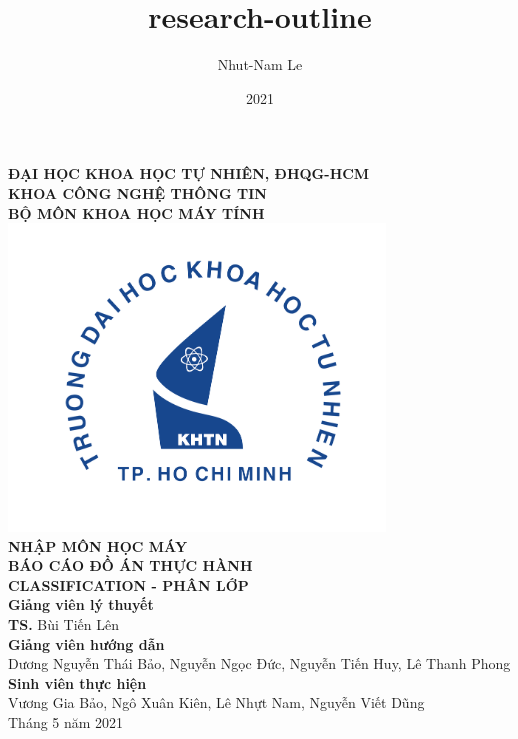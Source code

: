 \documentclass{article}
\title{research-outline}
\author{Nhut-Nam Le}
\date{2021}
\newcommand\B{\rule[-1.2ex]{0pt}{0pt}} %
\begin{document}
	\begin{titlepage}
		\begin{center}
			\large{\textbf{ĐẠI HỌC KHOA HỌC TỰ NHIÊN, ĐHQG-HCM\\KHOA CÔNG NGHỆ THÔNG TIN\\BỘ MÔN KHOA HỌC MÁY TÍNH}}\\
			\includegraphics[width=0.75\textwidth]{images/khtn.png}\\
			\large \textbf{NHẬP MÔN HỌC MÁY}\\[0.1in]
			\huge \textbf{BÁO CÁO ĐỒ ÁN THỰC HÀNH}\\[0.1in]
			\huge \textbf{CLASSIFICATION - PHÂN LỚP}\\[0.1in]
			\vfill
			\normalsize
			\normalsize
			\textbf{Giảng viên lý thuyết}\\
			{\textbf{TS.} Bùi Tiến Lên}\\[0.1in]
			\textbf{Giảng viên hướng dẫn}\\
			\vspace{0.1in}
			{Dương Nguyễn Thái Bảo, Nguyễn Ngọc Đức, Nguyễn Tiến Huy, Lê Thanh Phong}\\[0.1in]
			\textbf{Sinh viên thực hiện} \\
			\vspace{0.1in}
			{Vương Gia Bảo, Ngô Xuân Kiên, Lê Nhựt Nam, Nguyễn Viết Dũng}\\[0.1in]
			\vfill
			Tháng 5 năm 2021
		\end{center}
	\end{titlepage}
	\newpage
	
	\cleardoublepage
\end{document}

